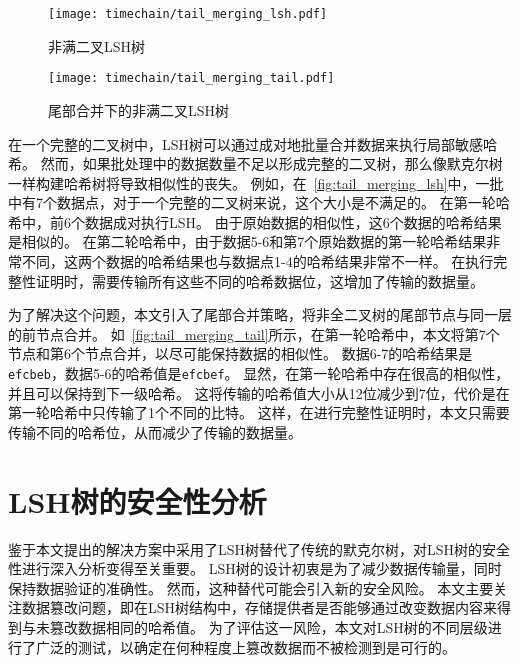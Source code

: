 \begin{figure}[t]
    \centering
	\begin{minipage}{0.8\linewidth}
        \centering
        \texttt{[image: timechain/tail\_merging\_lsh.pdf]}
        \caption{非满二叉LSH树}
        \label{fig:tail_merging_lsh}
	\end{minipage}
\end{figure}

\begin{figure}[t]
    \centering
	\begin{minipage}{0.8\linewidth}
        \centering
        \texttt{[image: timechain/tail\_merging\_tail.pdf]}
	\end{minipage}
	\caption{尾部合并下的非满二叉LSH树}
	\label{fig:tail_merging_tail}
\end{figure}

在一个完整的二叉树中，LSH树可以通过成对地批量合并数据来执行局部敏感哈希。
然而，如果批处理中的数据数量不足以形成完整的二叉树，那么像默克尔树一样构建哈希树将导致相似性的丧失。
例如，在~\autoref{fig:tail_merging_lsh}中，一批中有7个数据点，对于一个完整的二叉树来说，这个大小是不满足的。
在第一轮哈希中，前6个数据成对执行LSH。
由于原始数据的相似性，这6个数据的哈希结果是相似的。
在第二轮哈希中，由于数据5-6和第7个原始数据的第一轮哈希结果非常不同，这两个数据的哈希结果也与数据点1-4的哈希结果非常不一样。
在执行完整性证明时，需要传输所有这些不同的哈希数据位，这增加了传输的数据量。

为了解决这个问题，本文引入了尾部合并策略，将非全二叉树的尾部节点与同一层的前节点合并。
如~\autoref{fig:tail_merging_tail}所示，在第一轮哈希中，本文将第7个节点和第6个节点合并，以尽可能保持数据的相似性。
数据6-7的哈希结果是\texttt{efcbeb}，数据5-6的哈希值是\texttt{efcbef}。
显然，在第一轮哈希中存在很高的相似性，并且可以保持到下一级哈希。
这将传输的哈希值大小从12位减少到7位，代价是在第一轮哈希中只传输了1个不同的比特。
这样，在进行完整性证明时，本文只需要传输不同的哈希位，从而减少了传输的数据量。

\section{LSH树的安全性分析}
鉴于本文提出的解决方案中采用了LSH树替代了传统的默克尔树，对LSH树的安全性进行深入分析变得至关重要。
LSH树的设计初衷是为了减少数据传输量，同时保持数据验证的准确性。
然而，这种替代可能会引入新的安全风险。
本文主要关注数据篡改问题，即在LSH树结构中，存储提供者是否能够通过改变数据内容来得到与未篡改数据相同的哈希值。
为了评估这一风险，本文对LSH树的不同层级进行了广泛的测试，以确定在何种程度上篡改数据而不被检测到是可行的。

